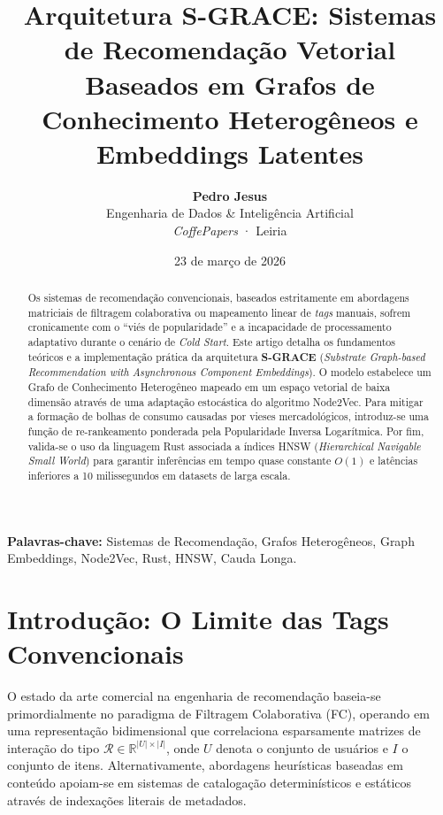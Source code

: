 \documentclass[11pt,a4paper]{article}
\title{Arquitetura S-GRACE: Sistemas de Recomendação Vetorial Baseados em
Grafos de Conhecimento Heterogêneos e Embeddings Latentes}
\author{%
  \textbf{Pedro Jesus}\\
  \small Engenharia de Dados \& Inteligência Artificial\\
  \small \textit{CoffePapers} · Leiria
}
\date{23 de março de 2026}
\begin{document}
\maketitle

\begin{abstract}
Os sistemas de recomendação convencionais, baseados estritamente em abordagens matriciais de
filtragem colaborativa ou mapeamento linear de \textit{tags} manuais, sofrem cronicamente com o
``viés de popularidade'' e a incapacidade de processamento adaptativo durante o cenário de
\textit{Cold Start}. Este artigo detalha os fundamentos teóricos e a implementação prática da
arquitetura \textbf{S-GRACE} (\textit{Substrate Graph-based Recommendation with Asynchronous
Component Embeddings}). O modelo estabelece um Grafo de Conhecimento Heterogêneo mapeado em um
espaço vetorial de baixa dimensão através de uma adaptação estocástica do algoritmo Node2Vec.
Para mitigar a formação de bolhas de consumo causadas por vieses mercadológicos, introduz-se uma
função de re-rankeamento ponderada pela Popularidade Inversa Logarítmica. Por fim, valida-se o
uso da linguagem Rust associada a índices HNSW (\textit{Hierarchical Navigable Small World}) para
garantir inferências em tempo quase constante $O(1)$ e latências inferiores a 10 milissegundos em
datasets de larga escala.
\end{abstract}

{\small\textbf{Palavras-chave:} Sistemas de Recomendação, Grafos Heterogêneos, Graph Embeddings,
Node2Vec, Rust, HNSW, Cauda Longa.}

\tableofcontents
\newpage


\section{Introdução: O Limite das Tags Convencionais}

O estado da arte comercial na engenharia de recomendação baseia-se primordialmente no paradigma de
Filtragem Colaborativa (FC), operando em uma representação bidimensional que correlaciona
esparsamente matrizes de interação do tipo $\mathcal{R} \in \mathbb{R}^{|U| \times |I|}$, onde
$U$ denota o conjunto de usuários e $I$ o conjunto de itens. Alternativamente, abordagens
heurísticas baseadas em conteúdo apoiam-se em sistemas de catalogação determinísticos e estáticos
através de indexações literais de metadados.
\end{document}
